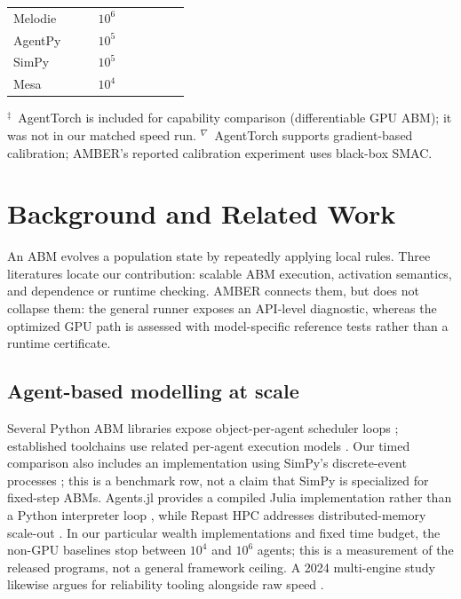 \documentclass[sigconf,nonacm,review,natbib=true]{acmart}
\theoremstyle{definition}
\theoremstyle{plain}
\theoremstyle{remark}
\begin{document}
\begin{table}[t]
\begin{tabularx}{\textwidth}{@{} >{\raggedright\arraybackslash}p{2.15cm} *{4}{Y} Y *{3}{Y} @{}}
Melodie &  &  & $10^6$ &  &  &  &  &  \\
AgentPy &  &  & $10^5$ &  &  &  &  &  \\
SimPy &  &  & $10^5$ &  &  &  &  &  \\
Mesa &  &  & $10^4$ &  &  &  &  &  \\
\bottomrule
\end{tabularx}

{\footnotesize $^{\ddagger}$~AgentTorch is included for capability comparison
(differentiable GPU ABM); it was not in our matched speed run.
$^{\nabla}$~AgentTorch supports gradient-based calibration; AMBER's reported
calibration experiment uses black-box SMAC.}
\end{table}


\section{Background and Related Work}

An ABM evolves a population state by repeatedly applying local rules. Three
literatures locate our contribution: scalable ABM execution, activation
semantics, and dependence or runtime checking. AMBER connects them, but does
not collapse them: the general runner exposes an API-level diagnostic, whereas
the optimized GPU path is assessed with model-specific reference tests rather
than a runtime certificate.

\subsection{Agent-based modelling at scale}

Several Python ABM libraries expose object-per-agent scheduler loops
\citep{kazil2020,foramitti2021,yu2023}; established toolchains use related
per-agent execution models \citep{wilensky1999,north2013}. Our timed comparison
also includes an implementation using SimPy's discrete-event processes
\citep{simpy2026}; this is a benchmark row, not a claim
that SimPy is specialized for fixed-step ABMs. Agents.jl provides a compiled
Julia implementation rather than a Python interpreter loop
\citep{datseris2022}, while Repast HPC addresses distributed-memory scale-out
\citep{collier2013}. In our particular wealth implementations and fixed time
budget, the non-GPU baselines stop between $10^4$ and $10^6$ agents; this is a
measurement of the released programs, not a general framework ceiling. A 2024
multi-engine study likewise argues for reliability tooling alongside raw speed
\citep{antelmi2024}.
\end{document}
